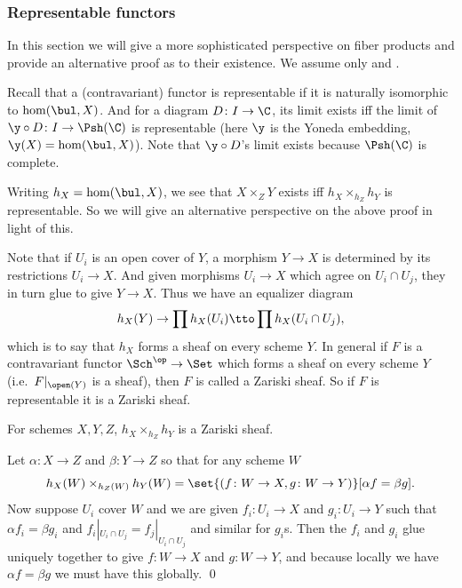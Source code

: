 \subsubsection{Representable functors}

In this section we will give a more sophisticated perspective on fiber products and provide an alternative
proof as to their existence.
We assume only  and .

Recall that a (contravariant) functor is {\emphcolor representable} if it is naturally isomorphic to
$\hom(\bul,X)$.
And for a diagram $D\colon I\to\C$, its limit exists iff the limit of $\y\circ D\colon I\to\Psh(\C)$ is
representable (here $\y$ is the Yoneda embedding, $\y(X)=\hom(\bul,X)$).
Note that $\y\circ D$'s limit exists because $\Psh(\C)$ is complete.

Writing $h_X=\hom(\bul,X)$, we see that $X\times_ZY$ exists iff $h_X\times_{h_Z}h_Y$ is representable.
So we will give an alternative perspective on the above proof in light of this.

Note that if $U_i$ is an open cover of $Y$, a morphism $Y\to X$ is determined by its restrictions
$U_i\to X$.
And given morphisms $U_i\to X$ which agree on $U_i\cap U_j$, they in turn glue to give $Y\to X$.
Thus we have an equalizer diagram
$$ h_X(Y) \to \prod h_X(U_i) \tto \prod h_X(U_i\cap U_j) , $$
which is to say that $h_X$ forms a sheaf on every scheme $Y$.
In general if $F$ is a contravariant functor $\Sch^\op\to\Set$ which forms a sheaf on every scheme $Y$
(i.e.\ $F|_{\open(Y)}$ is a sheaf), then $F$ is called a {\emphcolor Zariski sheaf}.
So if $F$ is representable it is a Zariski sheaf.

\blemm[name={fiberzariski}]

    For schemes $X,Y,Z$, $h_X\times_{h_Z}h_Y$ is a Zariski sheaf.

\elemm

\bproof

    Let $\alpha\colon X\to Z$ and $\beta\colon Y\to Z$ so that for any scheme $W$
    $$ h_X(W)\times_{h_Z(W)}h_Y(W) = \set{(f\colon W\to X,g\colon W\to Y)}[\alpha f=\beta g] . $$
    Now suppose $U_i$ cover $W$ and we are given $f_i\colon U_i\to X$ and $g_i\colon U_i\to Y$ such that
    $\alpha f_i=\beta g_i$ and $f_i|_{U_i\cap U_j}=f_j|_{U_i\cap U_j}$ and similar for $g_i$s.
    Then the $f_i$ and $g_i$ glue uniquely together to give $f\colon W\to X$ and $g\colon W\to Y$, and
    because locally we have $\alpha f=\beta g$ we must have this globally.
    \qed

